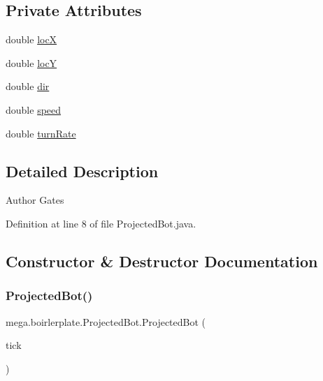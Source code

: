 \subsection*{Private Attributes}
\begin{DoxyCompactItemize}
\item 
double \hyperlink{classmega_1_1boirlerplate_1_1_projected_bot_a8ade4f00fcf9d3f12bdc94b2d6771c37}{locX}
\item 
double \hyperlink{classmega_1_1boirlerplate_1_1_projected_bot_a6023cf4c541167bd274854d38b845df5}{locY}
\item 
double \hyperlink{classmega_1_1boirlerplate_1_1_projected_bot_a6e56d1177cea43ba6fc3159d7bee57a0}{dir}
\item 
double \hyperlink{classmega_1_1boirlerplate_1_1_projected_bot_ad283244a356fecb209afdffb9db98d63}{speed}
\item 
double \hyperlink{classmega_1_1boirlerplate_1_1_projected_bot_af8779f0a2c73029ae591f841dab2feea}{turn\+Rate}
\end{DoxyCompactItemize}


\subsection{Detailed Description}
\begin{DoxyAuthor}{Author}
Gates 
\end{DoxyAuthor}


Definition at line 8 of file Projected\+Bot.\+java.



\subsection{Constructor \& Destructor Documentation}
\mbox{\label{classmega_1_1boirlerplate_1_1_projected_bot_af1ec5b4d0031d1df15965b168e4e1db2}} 
\subsubsection{\texorpdfstring{Projected\+Bot()}{ProjectedBot()}\hspace{0.1cm}{\footnotesize\ttfamily [1/2]}}
{\footnotesize\ttfamily mega.\+boirlerplate.\+Projected\+Bot.\+Projected\+Bot (\begin{DoxyParamCaption}\item[{Other\+Robot.\+Tick}]{tick }\end{DoxyParamCaption})}

